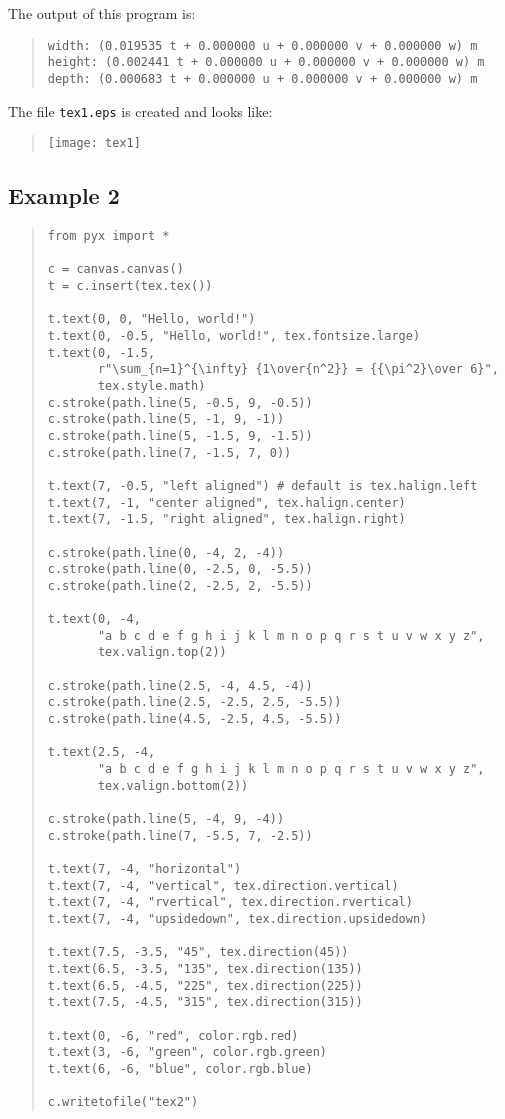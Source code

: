 The output of this program is:
\begin{quote}
\begin{verbatim}
width: (0.019535 t + 0.000000 u + 0.000000 v + 0.000000 w) m
height: (0.002441 t + 0.000000 u + 0.000000 v + 0.000000 w) m
depth: (0.000683 t + 0.000000 u + 0.000000 v + 0.000000 w) m
\end{verbatim}
\end{quote}

The file \verb|tex1.eps| is created and looks like:
\begin{quote}
\texttt{[image: tex1]}
\end{quote}

\subsection{Example 2}
\begin{quote}
\begin{verbatim}
from pyx import *

c = canvas.canvas()
t = c.insert(tex.tex())

t.text(0, 0, "Hello, world!")
t.text(0, -0.5, "Hello, world!", tex.fontsize.large)
t.text(0, -1.5,
       r"\sum_{n=1}^{\infty} {1\over{n^2}} = {{\pi^2}\over 6}",
       tex.style.math)
c.stroke(path.line(5, -0.5, 9, -0.5))
c.stroke(path.line(5, -1, 9, -1))
c.stroke(path.line(5, -1.5, 9, -1.5))
c.stroke(path.line(7, -1.5, 7, 0))

t.text(7, -0.5, "left aligned") # default is tex.halign.left
t.text(7, -1, "center aligned", tex.halign.center)
t.text(7, -1.5, "right aligned", tex.halign.right)

c.stroke(path.line(0, -4, 2, -4))
c.stroke(path.line(0, -2.5, 0, -5.5))
c.stroke(path.line(2, -2.5, 2, -5.5))

t.text(0, -4,
       "a b c d e f g h i j k l m n o p q r s t u v w x y z",
       tex.valign.top(2))

c.stroke(path.line(2.5, -4, 4.5, -4))
c.stroke(path.line(2.5, -2.5, 2.5, -5.5))
c.stroke(path.line(4.5, -2.5, 4.5, -5.5))

t.text(2.5, -4,
       "a b c d e f g h i j k l m n o p q r s t u v w x y z",
       tex.valign.bottom(2))

c.stroke(path.line(5, -4, 9, -4))
c.stroke(path.line(7, -5.5, 7, -2.5))

t.text(7, -4, "horizontal")
t.text(7, -4, "vertical", tex.direction.vertical)
t.text(7, -4, "rvertical", tex.direction.rvertical)
t.text(7, -4, "upsidedown", tex.direction.upsidedown)

t.text(7.5, -3.5, "45", tex.direction(45))
t.text(6.5, -3.5, "135", tex.direction(135))
t.text(6.5, -4.5, "225", tex.direction(225))
t.text(7.5, -4.5, "315", tex.direction(315))

t.text(0, -6, "red", color.rgb.red)
t.text(3, -6, "green", color.rgb.green)
t.text(6, -6, "blue", color.rgb.blue)

c.writetofile("tex2")
\end{verbatim}
\end{quote}


